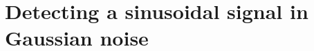 \documentclass[paper-main.tex]{subfiles}
\begin{document}

\section{Detecting a sinusoidal signal in Gaussian noise}
\label{app:sinusoid_likelihood}
\end{document}
